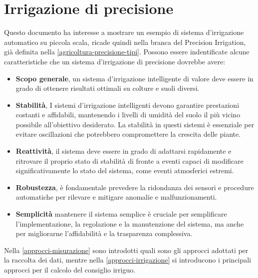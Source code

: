 \documentclass[12pt,a4paper,openright,twoside, openany]{book}
\begin{document}
\section{Irrigazione di precisione}
\label{irrigazione-di-precisione}

Questo documento ha interesse a mostrare un esempio di sistema d'irrigazione automatico su piccola scala, ricade quindi nella branca del Precision Irrigation, già definita nella \cref{agricoltura-precisione-tipi}.
Possono essere indentificate alcune caratteristiche che un sistema d'irrigazione di precisione dovrebbe avere:
\begin{itemize}
    \item \textbf{Scopo generale}, un sistema d'irrigazione intelligente di valore deve essere in grado di ottenere risultati ottimali su colture e suoli diversi.
    \item \textbf{Stabilità}, I sistemi d'irrigazione intelligenti devono garantire prestazioni costanti e affidabili, mantenendo i livelli di umidità del suolo il più vicino possibile all'obiettivo desiderato. La stabilità in questi sistemi è essenziale per evitare oscillazioni che potrebbero compromettere la crescita delle piante.
    \item \textbf{Reattività}, il sistema deve essere in grado di adattarsi rapidamente e ritrovare il proprio stato di stabilità di fronte a eventi capaci di modificare significativamente lo stato del sistema, come eventi atmosferici estremi.
    \item \textbf{Robustezza}, è fondamentale prevedere la ridondanza dei sensori e procedure automatiche per rilevare e mitigare anomalie e malfunzionamenti.
    \item \textbf{Semplicità} mantenere il sistema semplice è cruciale per semplificare l'implementazione, la regolazione e la manutenzione del sistema, ma anche per migliorarne l'affidabilità e la trasparenza complessiva.
\end{itemize}

Nella \cref{approcci-misurazione} sono introdotti quali sono gli approcci adottati per la raccolta dei dati, mentre nella \cref{approcci-irrigazione} si introducono i principali approcci per il calcolo del consiglio irriguo.

\end{document}
